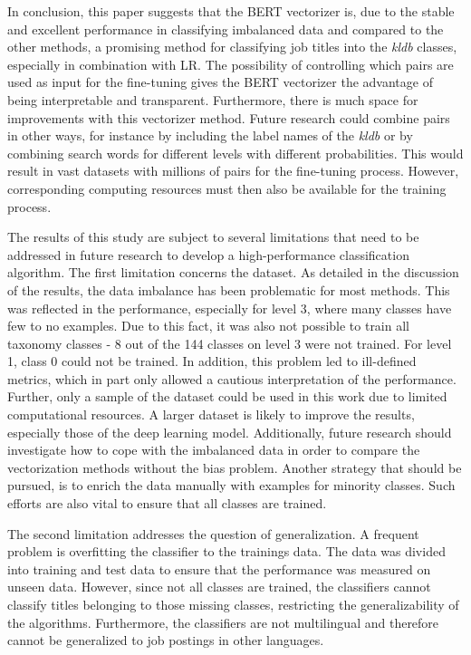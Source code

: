 \documentclass[12pt, a4paper, titlepage]{article}
\begin{document}
In conclusion, this paper suggests that the \ac{BERT} vectorizer is, due to the stable and excellent performance in classifying imbalanced data and compared to the other methods, a promising method for classifying job titles into the \textit{kldb} classes, especially in combination with \ac{LR}. The possibility of controlling which pairs are used as input for the fine-tuning gives the \ac{BERT} vectorizer the advantage of being interpretable and transparent. Furthermore, there is much space for improvements with this vectorizer method. Future research could combine pairs in other ways, for instance by including the label names of the \textit{kldb} or by combining search words for different levels with different probabilities. This would result in vast datasets with millions of pairs for the fine-tuning process. However, corresponding computing resources must then also be available for the training process. 

The results of this study are subject to several limitations that need to be addressed in future research to develop a high-performance classification algorithm. The first limitation concerns the dataset. As detailed in the discussion of the results, the data imbalance has been problematic for most methods. This was reflected in the performance, especially for level 3, where many classes have few to no examples. Due to this fact, it was also not possible to train all taxonomy classes - 8 out of the 144 classes on level 3 were not trained. For level 1, class 0 could not be trained. In addition, this problem led to ill-defined metrics, which in part only allowed a cautious interpretation of the performance. Further, only a sample of the dataset could be used in this work due to limited computational resources. A larger dataset is likely to improve the results, especially those of the deep learning model. Additionally, future research should investigate how to cope with the imbalanced data in order to compare the vectorization methods without the bias problem. Another strategy that should be pursued, is to enrich the data manually with examples for minority classes. Such efforts are also vital to ensure that all classes are trained.

The second limitation addresses the question of generalization. A frequent problem is overfitting the classifier to the trainings data. The data was divided into training and test data to ensure that the performance was measured on unseen data. However, since not all classes are trained, the classifiers cannot classify titles belonging to those missing classes, restricting the generalizability of the algorithms. Furthermore, the classifiers are not multilingual and therefore cannot be generalized to job postings in other languages. 
\end{document}
